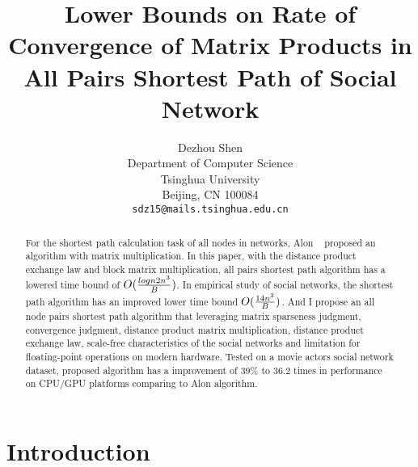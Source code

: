 \documentclass[review]{cvpr}
\begin{document}
\title{Lower Bounds on Rate of Convergence of Matrix Products in All Pairs Shortest Path of Social Network}

\author{Dezhou Shen\\
Department of Computer Science\\
Tsinghua University\\
Beijing, CN 100084\\
{\tt\small sdz15@mails.tsinghua.edu.cn}
}

\maketitle


\begin{abstract}
  For the shortest path calculation task of all nodes in networks, Alon \etal~\cite{alon1997exponent} proposed an algorithm with matrix multiplication.
  In this paper, with the distance product exchange law and block matrix multiplication, all pairs shortest path algorithm has a lowered time bound of \(O({logn2n^3\over B})\).
  In empirical study of social networks, the shortest path algorithm has an improved lower time bound \(O({14n^3 \over B})\).
  And I propose an all node pairs shortest path algorithm that leveraging matrix sparseness judgment, convergence judgment, distance product matrix multiplication, distance product exchange law,
  scale-free characteristics of the social networks and limitation for floating-point operations on modern hardware.
  Tested on a movie actors social network dataset, proposed algorithm has a improvement of 39\% to 36.2 times in performance on CPU/GPU platforms comparing to Alon \etal algorithm.
\end{abstract}

\section{Introduction}
\end{document}
